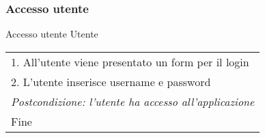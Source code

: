 \begin{minipage}{\textwidth}
    \subsubsection{Accesso utente}
    \usecase
        {Accesso utente}
        {Utente}
        {
            \begin{tabular}{l}
                1. All'utente viene presentato un form per il login\\
                2. L'utente inserisce username e password\\
                \textit{Postcondizione: l'utente ha accesso all'applicazione}\\
                Fine
            \end{tabular} \\
        }
        \vspace{0.5cm}

\end{minipage}